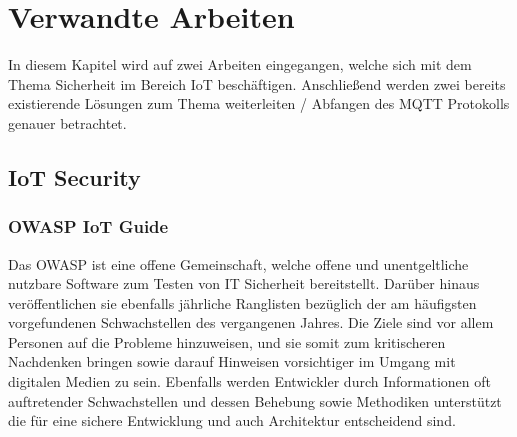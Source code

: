 \chapter{Verwandte Arbeiten}
In diesem Kapitel wird auf zwei Arbeiten eingegangen, welche sich mit dem Thema Sicherheit im Bereich \ac{IoT} beschäftigen. Anschließend werden zwei bereits existierende Lösungen zum Thema weiterleiten / Abfangen des \ac{MQTT} Protokolls genauer betrachtet.

\section{IoT Security}
    \subsection{OWASP IoT Guide}
    Das \ac{OWASP} ist eine offene Gemeinschaft, welche offene und unentgeltliche nutzbare Software zum Testen von IT Sicherheit bereitstellt. Darüber hinaus veröffentlichen sie ebenfalls jährliche Ranglisten bezüglich der am häufigsten vorgefundenen Schwachstellen des vergangenen Jahres. Die Ziele sind vor allem Personen auf die Probleme hinzuweisen, und sie somit zum kritischeren Nachdenken bringen sowie darauf Hinweisen vorsichtiger im Umgang mit digitalen Medien zu sein. Ebenfalls werden Entwickler durch Informationen oft auftretender Schwachstellen und dessen Behebung sowie Methodiken unterstützt die für eine sichere Entwicklung und auch Architektur entscheidend sind.
    
